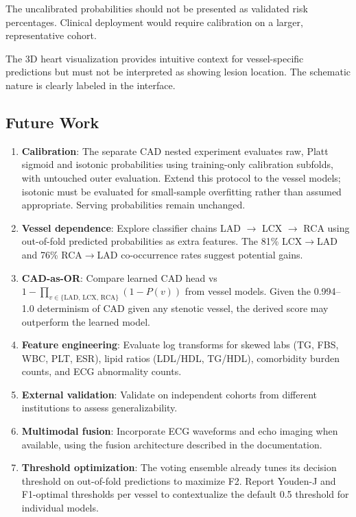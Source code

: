 \documentclass[conference]{IEEEtran}
\begin{document}
The uncalibrated probabilities should not be presented as validated risk percentages. Clinical deployment would require calibration on a larger, representative cohort.

The 3D heart visualization provides intuitive context for vessel-specific predictions but must not be interpreted as showing lesion location. The schematic nature is clearly labeled in the interface.

\subsection{Future Work}

\begin{enumerate}
    \item \textbf{Calibration}: The separate CAD nested experiment evaluates raw, Platt sigmoid and isotonic probabilities using training-only calibration subfolds, with untouched outer evaluation. Extend this protocol to the vessel models; isotonic must be evaluated for small-sample overfitting rather than assumed appropriate. Serving probabilities remain unchanged.
    \item \textbf{Vessel dependence}: Explore classifier chains LAD $\rightarrow$ LCX $\rightarrow$ RCA using out-of-fold predicted probabilities as extra features. The 81\% LCX$\rightarrow$LAD and 76\% RCA$\rightarrow$LAD co-occurrence rates suggest potential gains.
    \item \textbf{CAD-as-OR}: Compare learned CAD head vs $1 - \prod_{v \in \{\text{LAD, LCX, RCA}\}} (1 - P(v))$ from vessel models. Given the 0.994--1.0 determinism of CAD given any stenotic vessel, the derived score may outperform the learned model.
    \item \textbf{Feature engineering}: Evaluate log transforms for skewed labs (TG, FBS, WBC, PLT, ESR), lipid ratios (LDL/HDL, TG/HDL), comorbidity burden counts, and ECG abnormality counts.
    \item \textbf{External validation}: Validate on independent cohorts from different institutions to assess generalizability.
    \item \textbf{Multimodal fusion}: Incorporate ECG waveforms and echo imaging when available, using the fusion architecture described in the documentation.
    \item \textbf{Threshold optimization}: The voting ensemble already tunes its decision threshold on out-of-fold predictions to maximize F2. Report Youden-J and F1-optimal thresholds per vessel to contextualize the default 0.5 threshold for individual models.
\end{enumerate}
\end{document}
